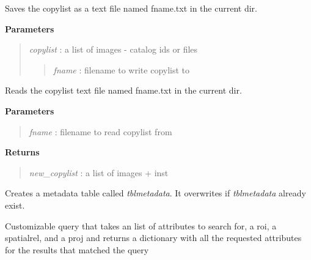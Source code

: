 \documentclass[letterpaper,10pt,english]{sphinxmanual}
\begin{document}
\begin{fulllineitems}

\begin{fulllineitems}
\label{code:Database.Database.copylistExport}
Saves the copylist as a text file named fname.txt in the current dir.

\textbf{Parameters}
\begin{quote}

\emph{copylist} : a list of images - catalog ids or files
\begin{quote}

\emph{fname}    : filename to write copylist to
\end{quote}
\end{quote}

\end{fulllineitems}


\begin{fulllineitems}
\label{code:Database.Database.copylistImport}
Reads the copylist text file named fname.txt in the current dir.

\textbf{Parameters}
\begin{quote}

\emph{fname}        : filename to read copylist from
\end{quote}

\textbf{Returns}
\begin{quote}

\emph{new\_copylist} : a list of images + inst
\end{quote}

\end{fulllineitems}


\begin{fulllineitems}
\label{code:Database.Database.createTblMetadata}
Creates a metadata table called \emph{tblmetadata}. It overwrites if \emph{tblmetadata} already exist.

\end{fulllineitems}


\begin{fulllineitems}
\label{code:Database.Database.customizedQuery}
Customizable query that takes an list of attributes to search for, a roi, a spatialrel, and a proj
and returns a dictionary with all the requested attributes for the results that matched the query


\end{fulllineitems}
\end{fulllineitems}
\end{document}

